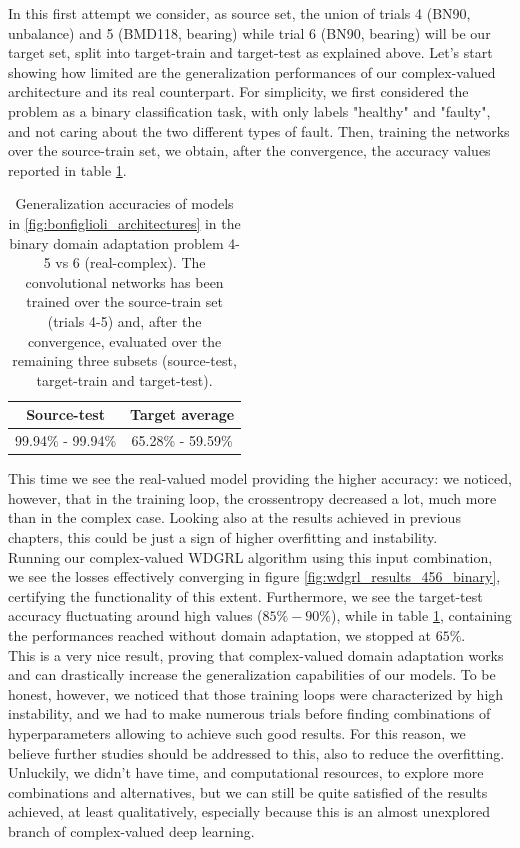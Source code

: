 \documentclass[../main.tex]{subfiles}
\begin{document}
In this first attempt we consider, as source set, the union of trials 4 (BN90, unbalance) and 5 (BMD118, bearing) while trial 6 (BN90, bearing) will be our target set, split into target-train and target-test as explained above. Let's start showing how limited are the generalization performances of our complex-valued architecture and its real counterpart. For simplicity, we first considered the problem as a binary classification task, with only labels "healthy" and "faulty", and not caring about the two different types of fault. Then, training the networks over the source-train set, we obtain, after the convergence, the accuracy values reported in table \ref{tab:bonfiglioli_binary_generalization_456}.
\begin{table}[!ht]
	\centering
	\begin{tabular}{c | c}
		\toprule
		\textbf{Source-test} & \textbf{Target average}\\
		\midrule
		99.94\% - 99.94\% & 65.28\% - 59.59\% \\
		\bottomrule
	\end{tabular}
\caption{Generalization accuracies of models in \ref{fig:bonfiglioli_architectures} in the binary domain adaptation problem 4-5 vs 6 (real-complex). The convolutional networks has been trained over the source-train set (trials 4-5) and, after the convergence, evaluated over the remaining three subsets (source-test, target-train and target-test).}
\label{tab:bonfiglioli_binary_generalization_456}
\end{table}
This time we see the real-valued model providing the higher accuracy: we noticed, however, that in the training loop, the crossentropy decreased a lot, much more than in the complex case. Looking also at the results achieved in previous chapters, this could be just a sign of higher overfitting and instability.\\
Running our complex-valued WDGRL algorithm using this input combination, we see the losses effectively converging in figure \ref{fig:wdgrl_results_456_binary}, certifying the functionality of this extent. Furthermore, we see the target-test accuracy fluctuating around high values ($85\%-90\%$), while in table \ref{tab:bonfiglioli_binary_generalization_456}, containing the performances reached without domain adaptation, we stopped at $65\%$.\\
This is a very nice result, proving that complex-valued domain adaptation works and can drastically increase the generalization capabilities of our models. To be honest, however, we noticed that those training loops were characterized by high instability, and we had to make numerous trials before finding combinations of hyperparameters allowing to achieve such good results. For this reason, we believe further studies should be addressed to this, also to reduce the overfitting. Unluckily, we didn't have time, and computational resources, to explore more combinations and alternatives, but we can still be quite satisfied of the results achieved, at least qualitatively, especially because this is an almost unexplored branch of complex-valued deep learning.
\end{document}
